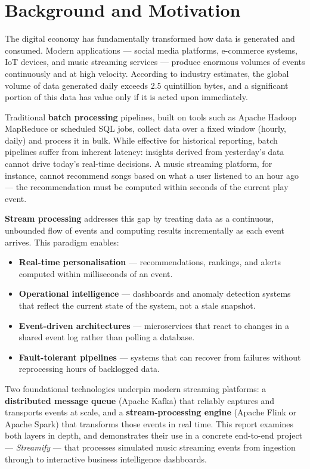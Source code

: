 \section{Background and Motivation}

The digital economy has fundamentally transformed how data is generated and consumed.
Modern applications — social media platforms, e-commerce systems, IoT devices, and
music streaming services — produce enormous volumes of events continuously and at high velocity.
According to industry estimates, the global volume of data generated daily exceeds 2.5 quintillion
bytes, and a significant portion of this data has value only if it is acted upon immediately.

Traditional \textbf{batch processing} pipelines, built on tools such as Apache Hadoop MapReduce
or scheduled SQL jobs, collect data over a fixed window (hourly, daily) and process it in bulk.
While effective for historical reporting, batch pipelines suffer from inherent latency:
insights derived from yesterday's data cannot drive today's real-time decisions.
A music streaming platform, for instance, cannot recommend songs based on what a user listened
to an hour ago — the recommendation must be computed within seconds of the current play event.

\textbf{Stream processing} addresses this gap by treating data as a continuous, unbounded flow
of events and computing results incrementally as each event arrives.
This paradigm enables:

\begin{itemize}
  \item \textbf{Real-time personalisation} — recommendations, rankings, and alerts computed within milliseconds of an event.
  \item \textbf{Operational intelligence} — dashboards and anomaly detection systems that reflect the current state of the system, not a stale snapshot.
  \item \textbf{Event-driven architectures} — microservices that react to changes in a shared event log rather than polling a database.
  \item \textbf{Fault-tolerant pipelines} — systems that can recover from failures without reprocessing hours of backlogged data.
\end{itemize}

Two foundational technologies underpin modern streaming platforms:
a \textbf{distributed message queue} (Apache Kafka) that reliably captures and transports
events at scale, and a \textbf{stream-processing engine} (Apache Flink or Apache Spark)
that transforms those events in real time.
This report examines both layers in depth, and demonstrates their use in a concrete
end-to-end project — \textit{Streamify} — that processes simulated music streaming events
from ingestion through to interactive business intelligence dashboards.
